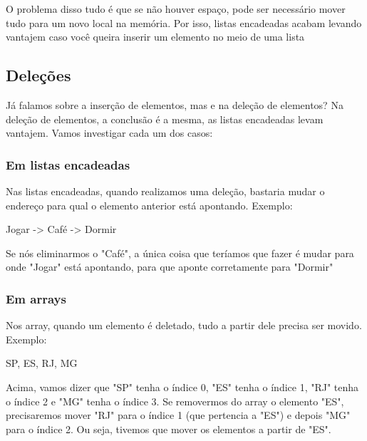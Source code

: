 \documentclass{report}
\begin{document}
	
	O problema disso tudo é que se não houver espaço, pode ser necessário mover tudo para um novo local na memória. Por isso, listas encadeadas acabam levando vantajem caso você queira inserir um elemento no meio de uma lista
	
	\subsection{Deleções}
	
	Já falamos sobre a inserção de elementos, mas e na deleção de elementos? Na deleção de elementos, a conclusão é a mesma, as listas encadeadas levam vantajem. Vamos investigar cada um dos casos:
	
	\subsubsection{Em listas encadeadas}
	
	Nas listas encadeadas, quando realizamos uma deleção, bastaria mudar o endereço para qual o elemento anterior está apontando. Exemplo:
	
	\begin{center}
		\begin{LARGE}
			Jogar -> Café -> Dormir
		\end{LARGE}
	\end{center}
	
	Se nós eliminarmos o "Café", a única coisa que teríamos que fazer é mudar para onde "Jogar" está apontando, para que aponte corretamente para "Dormir"

	\subsubsection{Em arrays}
	
	Nos array, quando um elemento é deletado, tudo a partir dele precisa ser movido. Exemplo:
	
	\begin{center}
		\begin{LARGE}
			SP, ES, RJ, MG
		\end{LARGE}
	\end{center}
	
	Acima, vamos dizer que "SP" tenha o índice 0, "ES" tenha o índice 1, "RJ" tenha o índice 2 e "MG" tenha o índice 3. Se removermos do array o elemento "ES", precisaremos mover "RJ" para o índice 1 (que pertencia a "ES") e depois "MG" para o índice 2. Ou seja, tivemos que mover os elementos a partir de "ES".\\
	
\end{document}
